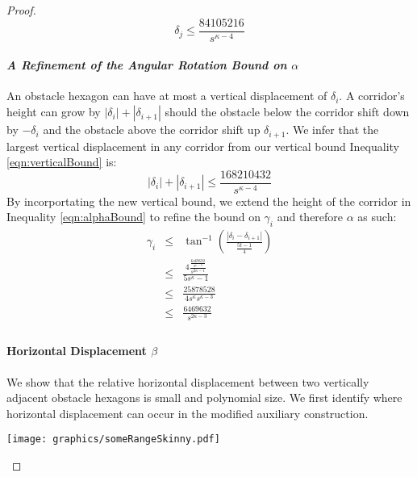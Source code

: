 \documentclass[10pt]{CSUNthesis}
\theoremstyle{plain}%
\theoremstyle{definition}
\theoremstyle{remark}
\newcommand{\lr}[1]{\left( #1 \right)}
\newcommand{\vlr}[1]{\left\vert #1 \right\vert}
\begin{document}
\begin{proof}
\begin{equation}\label{eqn:verticalBound}
\delta_j \leq \frac{84105216}{s^{\kappa-4}}
\end{equation}


\paragraph{\textit{A Refinement of the Angular Rotation Bound on $\alpha$}}
An obstacle hexagon can have at most a vertical displacement of $\delta_i$.  
A corridor's height can grow by $\vlr{\delta_i} + \vlr{\delta_{i+1}}$ should the obstacle below the corridor shift down by $-\delta_i$ and the obstacle above the corridor shift up $\delta_{i+1}$.  
We infer that the largest vertical displacement in any corridor from our vertical bound Inequality \ref{eqn:verticalBound} is:
$$\vlr{\delta_i} + \vlr{\delta_{i+1}} \leq \frac{168210432}{s^{\kappa-4}}$$
By incorportating the new vertical bound, we extend the height of the corridor in Inequality \ref{eqn:alphaBound} to refine the bound on $\gamma_i$ and therefore $\alpha$ as such:
\begin{equation}\label{eqn:alphaBoundRefined}
\begin{array}{rcl}
\gamma_i & \leq & \tan^{-1} \lr{\frac{\vlr{\delta_i - \delta_{i+1}}}
									 {	\frac{5t -1}{4}	}
								}\\
&\leq& \frac{4 \frac{\frac{6469632}{s^{\kappa-3}}}{s^{2\kappa-1}}	}
			  {	5s^\kappa -1}\\
&\leq& \frac{ 25878528 }
			  {	4s^\kappa	s^{\kappa-3}} \\
&\leq& \frac{6469632}{s^{2\kappa-3}}\\
\end{array} 
\end{equation}

\paragraph{Horizontal Displacement $\beta$}

We show that the relative horizontal displacement between two vertically adjacent obstacle hexagons is small and polynomial size.
We first identify where horizontal displacement can occur in the modified auxiliary construction.  

\begin{minipage}{\linewidth}
\begin{center}
\texttt{[image: graphics/someRangeSkinny.pdf]}
\label{fig:someRangeSkinny.pdf}
\end{center}
\end{minipage}


\end{proof}
\end{document}
